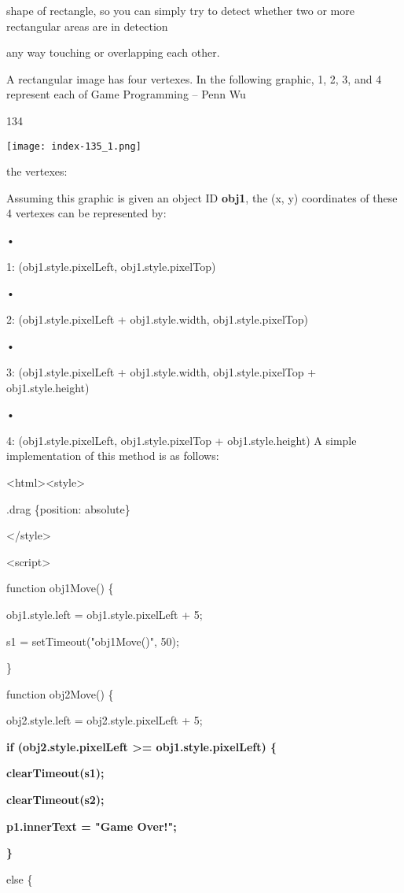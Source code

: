 \documentclass[
]{article}
\begin{document}
shape of rectangle, so you can simply try to detect whether two or more
rectangular areas are in detection

any way touching or overlapping each other.

A rectangular image has four vertexes. In the following graphic, 1, 2,
3, and 4 represent each of Game Programming -- Penn Wu

134

\protect\hypertarget{index_split_009.htmlux5cux23p135}{}{}\texttt{[image: index-135\_1.png]}

the vertexes:

Assuming this graphic is given an object ID \textbf{obj1}, the (x, y)
coordinates of these 4 vertexes can be represented by:

•

1: (obj1.style.pixelLeft, obj1.style.pixelTop)

•

2: (obj1.style.pixelLeft + obj1.style.width, obj1.style.pixelTop)

•

3: (obj1.style.pixelLeft + obj1.style.width, obj1.style.pixelTop +
obj1.style.height)

•

4: (obj1.style.pixelLeft, obj1.style.pixelTop + obj1.style.height) A
simple implementation of this method is as follows:

\textless html\textgreater\textless style\textgreater{}

.drag \{position: absolute\}

\textless/style\textgreater{}

\textless script\textgreater{}

function obj1Move() \{

obj1.style.left = obj1.style.pixelLeft + 5;

s1 = setTimeout("obj1Move()", 50);

\}

function obj2Move() \{

obj2.style.left = obj2.style.pixelLeft + 5;

\textbf{if (obj2.style.pixelLeft \textgreater= obj1.style.pixelLeft) \{}

\textbf{clearTimeout(s1);}

\textbf{clearTimeout(s2);}

\textbf{p1.innerText = "Game Over!";}

\textbf{\}}

else \{
\end{document}
